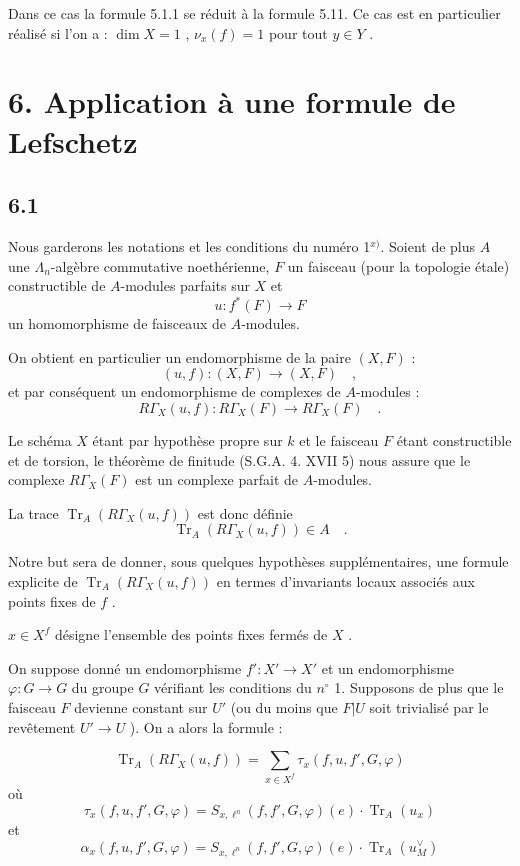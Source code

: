 \documentclass[11pt]{article}
\providecommand{\Tr}{\operatorname{Tr}}
\providecommand{\Tr}{\operatorname{Tr}}
\providecommand{\Tr}{\operatorname{Tr}}
\providecommand{\Tr}{\operatorname{Tr}}
\providecommand{\La}{\Lambda}
\providecommand{\Tr}{\operatorname{Tr}}
\begin{document}
Dans ce cas la formule 5.1.1 se réduit à la formule 5.11. Ce cas est en particulier réalisé si l'on a : $\dim X = 1$ , $\nu_x(f) = 1$ pour tout $y \in Y$ .

\section*{6. Application à une formule de Lefschetz}

\subsection*{6.1}
Nous garderons les notations et les conditions du numéro 1$^{x)}$. Soient de plus $A$ une $\La_n$-algèbre commutative noethérienne, $F$ un faisceau (pour la topologie étale) constructible de $A$-modules parfaits sur $X$ et
\[
u : f^*(F) \longrightarrow F
\]
un homomorphisme de faisceaux de $A$-modules.

On obtient en particulier un endomorphisme de la paire $(X, F)$ :
\[
(u, f) : (X, F) \longrightarrow (X, F) \quad ,
\]
et par conséquent un endomorphisme de complexes de $A$-modules :
\[
R\Gamma_X(u, f) : R\Gamma_X(F) \longrightarrow R\Gamma_X(F) \quad .
\]

Le schéma $X$ étant par hypothèse propre sur $k$ et le faisceau $F$ étant constructible et de torsion, le théorème de finitude (S.G.A. 4. XVII 5) nous assure que le complexe $R\Gamma_X(F)$ est un complexe parfait de $A$-modules.

La trace $\Tr_A(R\Gamma_X(u, f))$ est donc définie
\[
\Tr_A(R\Gamma_X(u, f)) \in A \quad .
\]

Notre but sera de donner, sous quelques hypothèses supplémentaires, une formule explicite de $\Tr_A(R\Gamma_X(u, f))$ en termes d'invariants locaux associés aux points fixes de $f$ .

$x \in X^f$ désigne l'ensemble des points fixes fermés de $X$ .

\bigskip

On suppose donné un endomorphisme $f' : X' \longrightarrow X'$ et un endomorphisme $\varphi : G \longrightarrow G$ du groupe $G$ vérifiant les conditions du $n^\circ$ 1. Supposons de plus que le faisceau $F$ devienne constant sur $U'$ (ou du moins que $F|U$ soit trivialisé par le revêtement $U' \longrightarrow U$ ). On a alors la formule :

\begin{equation}\tag{6.2}
\Tr_A(R\Gamma_X(u, f)) = \sum_{x \in X^f} \tau_x(f,u, f', G, \varphi)
\end{equation}
où
\begin{equation}\tag{6.3}
\tau_x(f,u, f', G, \varphi) = S_{x,\ell^n}(f, f', G, \varphi)(e) \cdot \Tr_A(u_x)
\end{equation}
et
\begin{equation}\tag{6.4}
\alpha_x(f,u, f', G, \varphi) = S_{x,\ell^n}(f, f', G, \varphi)(e) \cdot \Tr_A(u_M^\vee)
\end{equation}
\end{document}
